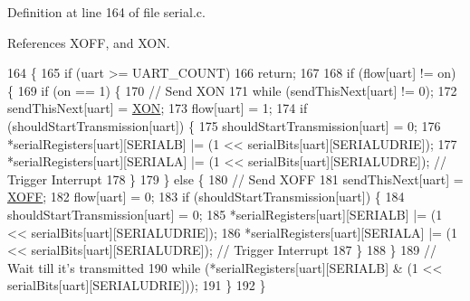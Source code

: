 Definition at line 164 of file serial.\-c.



References X\-O\-F\-F, and X\-O\-N.


\begin{DoxyCode}
164                                        \{
165     \textcolor{keywordflow}{if} (uart >= UART\_COUNT)
166         \textcolor{keywordflow}{return};
167 
168     \textcolor{keywordflow}{if} (flow[uart] != on) \{
169         \textcolor{keywordflow}{if} (on == 1) \{
170             \textcolor{comment}{// Send XON}
171             \textcolor{keywordflow}{while} (sendThisNext[uart] != 0);
172             sendThisNext[uart] = \hyperlink{group__uart_gacdf721774c51e08c6609e6fa8cf82cc9}{XON};
173             flow[uart] = 1;
174             \textcolor{keywordflow}{if} (shouldStartTransmission[uart]) \{
175                 shouldStartTransmission[uart] = 0;
176                 *serialRegisters[uart][SERIALB] |= (1 << serialBits[uart][SERIALUDRIE]);
177                 *serialRegisters[uart][SERIALA] |= (1 << serialBits[uart][SERIALUDRE]); \textcolor{comment}{// Trigger
       Interrupt}
178             \}
179         \} \textcolor{keywordflow}{else} \{
180             \textcolor{comment}{// Send XOFF}
181             sendThisNext[uart] = \hyperlink{group__uart_ga67fd78ae15d2b67c10d44d69a49ab1c5}{XOFF};
182             flow[uart] = 0;
183             \textcolor{keywordflow}{if} (shouldStartTransmission[uart]) \{
184                 shouldStartTransmission[uart] = 0;
185                 *serialRegisters[uart][SERIALB] |= (1 << serialBits[uart][SERIALUDRIE]);
186                 *serialRegisters[uart][SERIALA] |= (1 << serialBits[uart][SERIALUDRE]); \textcolor{comment}{// Trigger
       Interrupt}
187             \}
188         \}
189         \textcolor{comment}{// Wait till it's transmitted}
190         \textcolor{keywordflow}{while} (*serialRegisters[uart][SERIALB] & (1 << serialBits[uart][SERIALUDRIE]));
191     \}
192 \}
\end{DoxyCode}
